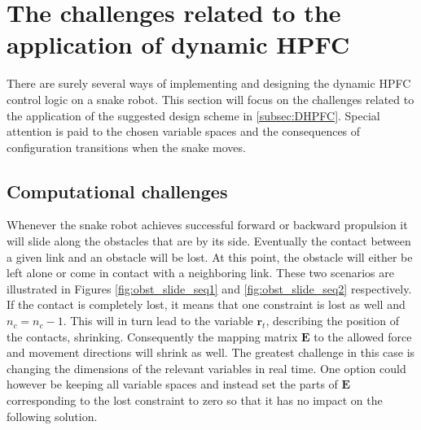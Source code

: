 




\section{The challenges related to the application of dynamic HPFC}

There are surely several ways of implementing and designing the dynamic HPFC control logic on a snake robot. This section will focus on the challenges related to the application of the suggested design scheme in \ref{subsec:DHPFC}. Special attention is paid to the chosen variable spaces and the consequences of configuration transitions when the snake moves.

\subsection{Computational challenges}

Whenever the snake robot achieves successful forward or backward propulsion it will slide along the obstacles that are by its side. Eventually the contact between a given link and an obstacle will be lost. At this point, the obstacle will either be left alone or come in contact with a neighboring link. These two scenarios are illustrated in Figures \ref{fig:obst_slide_seq1} and \ref{fig:obst_slide_seq2} respectively. If the contact is completely lost, it means that one constraint is lost as well and $n_c = n_c - 1$. This will in turn lead to the variable $\mathbf{r}_t$, describing the position of the contacts, shrinking. Consequently the mapping matrix $\mathbf{E}$ to the allowed force and movement directions will shrink as well. The greatest challenge in this case is changing the dimensions of the relevant variables in real time. One option could however be keeping all variable spaces and instead set the parts of $\mathbf{E}$ corresponding to the lost constraint to zero so that it has no impact on the following solution.

